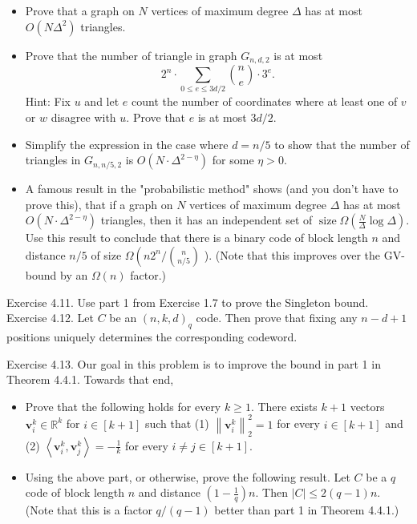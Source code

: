\documentclass[10pt]{article}
\begin{document}
\begin{itemize}
  \item[1.] Prove that a graph on $N$ vertices of maximum degree $\Delta$ has at most $O\left(N \Delta^{2}\right)$ triangles.
  \item[2.] Prove that the number of triangle in graph $G_{n, d, 2}$ is at most
$$
2^{n} \cdot \sum_{0 \leq e \leq 3 d / 2}\binom{n}{e} \cdot 3^{e} .
$$
Hint: Fix $u$ and let $e$ count the number of coordinates where at least one of $v$ or $w$ disagree with $u$. Prove that $e$ is at most $3 d / 2$.
  \item[3.] Simplify the expression in the case where $d=n / 5$ to show that the number of triangles in $G_{n, n / 5,2}$ is $O\left(N \cdot \Delta^{2-\eta}\right)$ for some $\eta>0$.
  \item[4.] A famous result in the "probabilistic method" shows (and you don't have to prove this), that if a graph on $N$ vertices of maximum degree $\Delta$ has at most $O\left(N \cdot \Delta^{2-\eta}\right)$ triangles, then it has an independent set of $\operatorname{size} \Omega\left(\frac{N}{\Delta} \log \Delta\right)$. Use this result to conclude that there is a binary code of block length $n$ and distance $n / 5$ of size $\Omega\left(n 2^{n} /\binom{n}{n / 5}\right.$ ). (Note that this improves over the GV-bound by an $\Omega(n)$ factor.)
\end{itemize}

Exercise 4.11. Use part 1 from Exercise 1.7 to prove the Singleton bound.\\
Exercise 4.12. Let $C$ be an $(n, k, d)_{q}$ code. Then prove that fixing any $n-d+1$ positions uniquely determines the corresponding codeword.

Exercise 4.13. Our goal in this problem is to improve the bound in part 1 in Theorem 4.4.1. Towards that end,

\begin{itemize}
  \item[1.] Prove that the following holds for every $k \geq 1$. There exists $k+1$ vectors $\mathbf{v}_{i}^{k} \in \mathbb{R}^{k}$ for $i \in[k+1]$ such that (1) $\left\|\mathbf{v}_{i}^{k}\right\|_{2}^{2}=1$ for every $i \in[k+1]$ and (2) $\left\langle\mathbf{v}_{i}^{k}, \mathbf{v}_{j}^{k}\right\rangle=-\frac{1}{k}$ for every $i \neq j \in[k+1]$.
  \item[2.] Using the above part, or otherwise, prove the following result. Let $C$ be a $q$ code of block length $n$ and distance $\left(1-\frac{1}{q}\right) n$. Then $|C| \leq 2(q-1) n$. (Note that this is a factor $q /(q-1)$ better than part 1 in Theorem 4.4.1.)
\end{itemize}
\end{document}
